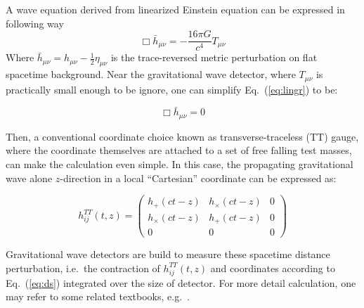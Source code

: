  
A wave equation derived from linearized Einstein equation can be expressed in following way
\begin{equation}
\label{eq:lingr}
    \Box \bar{h}_{\mu\nu} = - \frac{16\pi G}{c^4}T_{\mu\nu}
\end{equation}
Where $\bar{h}_{\mu\nu} = h_{\mu\nu}-\frac{1}{2}\eta_{\mu\nu}$ is the trace-reversed metric perturbation on flat spacetime background. Near the gravitational wave detector, where $T_{\mu\nu}$ is practically small enough to be ignore, one can simplify Eq.~(\ref{eq:lingr}) to be:

\begin{equation}
\label{eq:lingr0}
    \Box \bar{h}_{\mu\nu} = 0
\end{equation}

Then, a conventional coordinate choice known as transverse-traceless (TT) gauge, where the coordinate themselves are attached to a set of free falling test masses, can make the calculation even simple. In this case, the propagating gravitational wave alone $z$-direction in a local ``Cartesian'' coordinate can be expressed as:

\begin{equation}
\label{eq:lingr}
    h^{TT}_{ij}(t,z) = 
\left(
\begin{array}{ccc}
  h_{+}(ct-z) & h_{\times}(ct-z) & 0  \\
  h_{\times}(ct-z) & h_{+}(ct-z) & 0  \\
  0 &0 & 0  
\end{array}
\right) 
\end{equation}


Gravitational wave detectors are build to measure these spacetime distance perturbation, i.e.~the contraction of $h^{TT}_{ij}(t,z)$ and coordinates according to Eq.~(\ref{eq:ds}) integrated over the size of detector.
For more detail calculation, one may refer to some related textbooks, e.g.~\cite{maggiore:gw1}.




